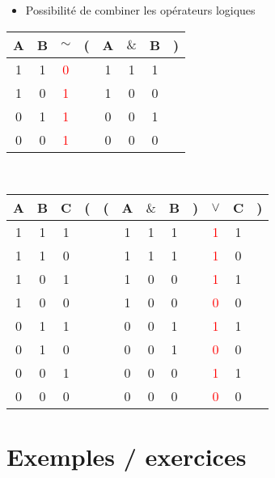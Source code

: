 \documentclass[12pt,a4paper]{article}
\begin{document}
	\begin{itemize}
		\item Possibilité de combiner les opérateurs logiques
	\end{itemize}

	\begin{small}
		\begin{tabular}{@{ }c@{ }@{ }c | c@{ }@{}c@{}@{ }c@{ }@{ }c@{ }@{ }c@{ }@{}c@{ }}
		A & B & $\sim$ & ( & A & $\&$ & B & )\\
		\hline 
		1 & 1 & \textcolor{red}{0} &  & 1 & 1 & 1 & \\
		1 & 0 & \textcolor{red}{1} &  & 1 & 0 & 0 & \\
		0 & 1 & \textcolor{red}{1} &  & 0 & 0 & 1 & \\
		0 & 0 & \textcolor{red}{1} &  & 0 & 0 & 0 & \\
	\end{tabular}
	\end{small}

	\ \\
	\begin{small}
		\begin{tabular}{@{ }c@{ }@{ }c@{ }@{ }c | c@{}@{}c@{}@{ }c@{ }@{ }c@{ }@{ }c@{ }@{}c@{}@{ }c@{ }@{ }c@{ }@{}c@{ }}
			A & B & C & ( & ( & A & $\&$ & B & ) & $\lor$ & C & )\\
			\hline 
			1 & 1 & 1 &  &  & 1 & 1 & 1 &  & \textcolor{red}{1} & 1 & \\
			1 & 1 & 0 &  &  & 1 & 1 & 1 &  & \textcolor{red}{1} & 0 & \\
			1 & 0 & 1 &  &  & 1 & 0 & 0 &  & \textcolor{red}{1} & 1 & \\
			1 & 0 & 0 &  &  & 1 & 0 & 0 &  & \textcolor{red}{0} & 0 & \\
			0 & 1 & 1 &  &  & 0 & 0 & 1 &  & \textcolor{red}{1} & 1 & \\
			0 & 1 & 0 &  &  & 0 & 0 & 1 &  & \textcolor{red}{0} & 0 & \\
			0 & 0 & 1 &  &  & 0 & 0 & 0 &  & \textcolor{red}{1} & 1 & \\
			0 & 0 & 0 &  &  & 0 & 0 & 0 &  & \textcolor{red}{0} & 0 & \\
		\end{tabular}
	\end{small}
	

	\section{Exemples / exercices}
	
\end{document}
